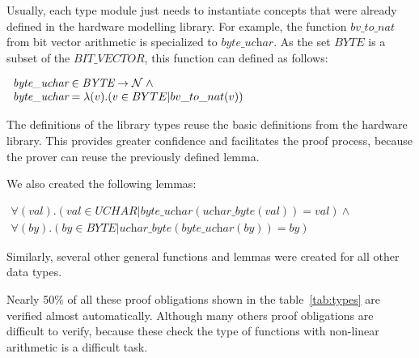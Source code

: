 \documentclass[a4paper]{llncs}
\begin{document}
Usually, each type module just needs to instantiate concepts that were already defined in the hardware
modelling library.  For example, the function $\textit{bv\_to\_nat}$ from bit vector arithmetic is
specialized to $\textit{byte\_uchar}$. As the set $\textit{BYTE}$ is a subset of the
$\textit{BIT\_VECTOR}$, this function can defined as follows:


$
\begin{array}{l}
\textit{byte\_uchar} \in \textit{BYTE} \fun \nat \land \\
\textit{byte\_uchar} = \lambda (v) . ( v \in BYTE | bv\_to\_nat(v) )
\end{array}
$

The definitions of the library types reuse the basic definitions from the hardware library. This provides
greater confidence and facilitates the proof process, because the prover can reuse the previously defined
lemma.


%

 We also created the following lemmas:
 
 $
 \begin{array}{l}
  \forall (val) . (val \in \textit{UCHAR} |
  \textit{byte\_uchar}(\textit{uchar\_byte}(val)) = val) \land\\
  \forall (by) . (by \in \textit{BYTE} |
  \textit{uchar\_byte}(\textit{byte\_uchar}(by)) = by)
 \end{array}
 $

Similarly, several other general functions and lemmas were created for all other data types.

Nearly 50\% of all these proof obligations shown in the table~\ref{tab:types}
are verified almost automatically. Although many others proof obligations are difficult to verify, because these
check the type of functions with non-linear arithmetic is a difficult task.
\end{document}
